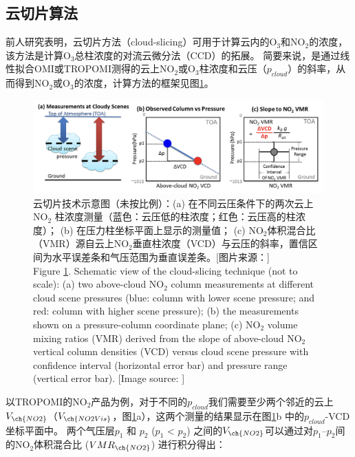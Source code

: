 \subsection{云切片算法} \label{sec:cloud-slicing}

前人研究表明，云切片方法（cloud-slicing）可用于计算云内的O$_3$和NO$_2$的浓度，
该方法是计算O$_3$总柱浓度的对流云微分法（CCD）的拓展\citep{Ziemke.1998,Ziemke.2001}。
简要来说，是通过线性拟合OMI或TROPOMI测得的云上NO$_2$或O$_3$柱浓度和云压（$p_{cloud}$）的斜率，从而得到NO$_2$或O$_3$的浓度，计算方法的框架见图\ref{fig:cloud-slicing_schematic}。


\begin{figure}[!htbp]
\centering
\includegraphics[width=\textwidth]{./figures/cloud-slicing_schematic.png}
\caption{云切片技术示意图（未按比例）：(a) 在不同云压条件下的两次云上NO$_2$ 柱浓度测量（蓝色：云压低的柱浓度；红色：云压高的柱浓度）；
(b) 在压力柱坐标平面上显示的测量值； (c) NO$_2$体积混合比（VMR）源自云上NO$_2$垂直柱浓度（VCD）与云压的斜率，置信区间为水平误差条和气压范围为垂直误差条。[图片来源：\citet{Choi.2014}]\\
Figure \ref{fig:cloud-slicing_schematic}. Schematic view of the cloud-slicing technique (not to scale):
(a) two above-cloud NO$_2$ column measurements at different cloud scene pressures (blue: column with lower scene pressure; and red: column with higher scene pressure);
(b) the measurements shown on a pressure-column coordinate plane;
(c) NO$_2$ volume mixing ratios (VMR) derived from the slope of above-cloud NO$_2$ vertical column densities (VCD) versus cloud scene pressure with confidence interval (horizontal error bar) and pressure range (vertical error bar). [Image source: \citet{Choi.2014}]
}
\label{fig:cloud-slicing_schematic}
\end{figure}

以TROPOMI的NO$_2$产品为例，对于不同的$p_{cloud}$我们需要至少两个邻近的云上$V_{\ch{NO2}}$（$V_{\ch{NO2Vis}}$，图\ref{fig:cloud-slicing_schematic}a），这两个测量的结果显示在图\ref{fig:cloud-slicing_schematic}b 中的$p_{cloud}$-VCD 坐标平面中。
两个气压层$p_1$ 和 $p_2$ ($p_1$ < $p_2$) 之间的$V_{\ch{NO2}}$可以通过对$p_1$--$p_2$间的NO$_2$体积混合比 ($VMR_{\ch{NO2}}$) 进行积分得出：


